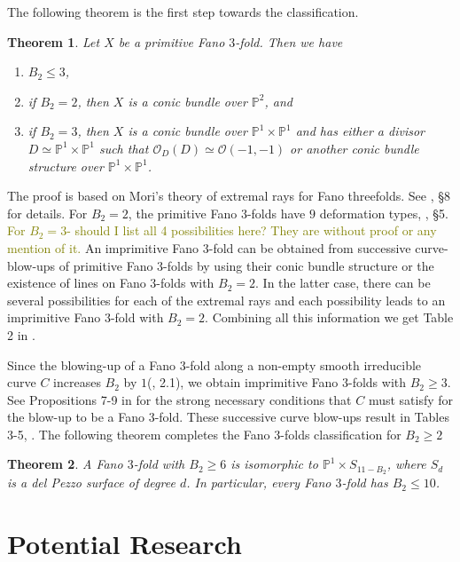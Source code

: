 \documentclass[11pt]{amsart}
\theoremstyle{plain}
\newtheorem{theorem}{Theorem}[section]
\theoremstyle{definition}
\theoremstyle{expl}
\begin{document}
    \noindent The following theorem is the first step towards the classification.
    \begin{theorem}
    	Let $X$ be a primitive Fano $3$-fold. Then we have 
    	\begin{enumerate}
    		\item $B_2 \leq 3$,
		\item if $B_2 =2$, then $X$ is a conic bundle over $\mathbb{P}^2$, and
    		\item if $B_2 =3$, then $X$ is a conic bundle over $\mathbb{P}^1 \times \mathbb{P}^1$ and has either a divisor $D \simeq \mathbb{P}^1 \times \mathbb{P}^1$ such that $\mathcal{O}_D(D) \simeq \mathcal{O}(-1,-1)$ or another conic bundle structure over $\mathbb{P}^1 \times \mathbb{P}^1$.
    	\end{enumerate}
    \end{theorem}
    The proof is based on Mori's theory of extremal rays for Fano threefolds. See \cite{MM83}, \S8 for details.
    For $B_2=2$, the primitive Fano $3$-folds have $9$ deformation types, \cite{MM83}, \S 5. \textcolor{olive}{For $B_2 =3$- should I list all 4 possibilities here? They are without proof or any mention of it.}
    An imprimitive Fano $3$-fold can be obtained from successive curve-blow-ups of primitive Fano $3$-folds by using their conic bundle structure or the existence of lines on Fano $3$-folds with $B_2=2$. In the latter case, there can be several possibilities for each of the extremal rays and each possibility leads to an imprimitive Fano $3$-fold with $B_2=2$. Combining all this information we get Table 2 in \cite{MM81}.
    
    Since the blowing-up of a Fano $3$-fold along a non-empty smooth irreducible curve $C$ increases $B_2$ by $1$(\cite{MM85}, 2.1), we obtain imprimitive Fano $3$-folds with $B_2 \geq 3$. See Propositions 7-9 in \cite{MM81} for the strong necessary conditions that $C$ must satisfy for the blow-up to be a Fano $3$-fold. These successive curve blow-ups result in Tables 3-5, \cite{MM81}. The following theorem completes the Fano $3$-folds classification for $B_2 \geq 2$
    \begin{theorem}
        A Fano $3$-fold with $B_2 \geq 6$ is isomorphic to $\mathbb{P}^1 \times S_{11-B_2}$, where $S_d$ is a del Pezzo surface of degree $d$. In particular, every Fano $3$-fold has $B_2 \leq 10$.
    \end{theorem}
    
\section{Potential Research}
\end{document}

